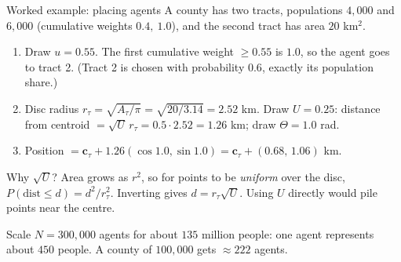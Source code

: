﻿\documentclass[9pt,aspectratio=169]{beamer}
\begin{document}
\begin{frame}{Worked example: placing agents}
 A county has two tracts, populations $4{,}000$ and $6{,}000$ (cumulative weights $0.4,\ 1.0$), and the second tract has area $20$ km$^2$.
 \begin{enumerate}\setlength\itemsep{3pt}
  \item Draw $u=0.55$. The first cumulative weight $\ge0.55$ is $1.0$, so the agent goes to tract 2. (Tract 2 is chosen with probability $0.6$, exactly its population share.)
  \item Disc radius $r_\tau=\sqrt{A_\tau/\pi}=\sqrt{20/3.14}=2.52$ km. Draw $U=0.25$: distance from centroid $=\sqrt U\,r_\tau=0.5\cdot2.52=1.26$ km; draw $\Theta=1.0$ rad.
  \item Position $=\bm c_\tau+1.26(\cos1.0,\sin1.0)=\bm c_\tau+(0.68,\,1.06)$ km.
 \end{enumerate}
 \begin{block}{Why $\sqrt U$?}\small
  Area grows as $r^2$, so for points to be \emph{uniform} over the disc, $P(\text{dist}\le d)=d^2/r_\tau^2$. Inverting gives $d=r_\tau\sqrt U$. Using $U$ directly would pile points near the centre.
 \end{block}
 \begin{block}{Scale}\small
  $N=300{,}000$ agents for about $135$ million people: one agent represents about $450$ people. A county of $100{,}000$ gets $\approx222$ agents.
 \end{block}
\end{frame}
\end{document}
